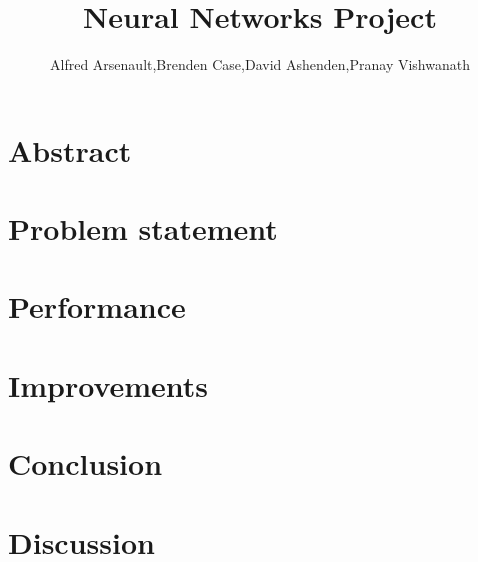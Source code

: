 \documentclass{article}
\title{Neural Networks Project}
\author{Alfred Arsenault,Brenden Case,David Ashenden,Pranay Vishwanath}
\begin{document}
\maketitle

\section{Abstract} 
\pagebreak

\section{Problem statement}
\smallbreak

\section{Performance}
\smallbreak

\section{Improvements}
\smallbreak

\section{Conclusion}
\smallbreak

\section{Discussion}
\end{document}
